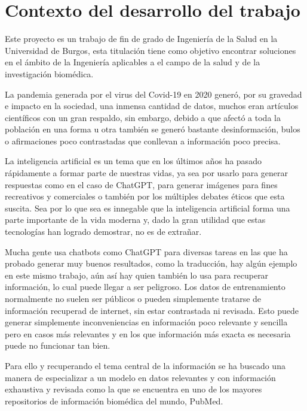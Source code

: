 
\section{Contexto del desarrollo del trabajo}

Este proyecto es un trabajo de fin de grado de Ingeniería de la Salud en la Universidad de Burgos, esta titulación tiene como objetivo encontrar soluciones en el ámbito de la Ingeniería aplicables a el campo de la salud y de la investigación biomédica.

La pandemia generada por el virus del Covid-19 en 2020 generó, por su gravedad e impacto en la sociedad, una inmensa cantidad de datos, muchos eran artículos científicos con un gran respaldo, sin embargo, debido a que afectó a toda la población en una forma u otra también se generó bastante desinformación, bulos o afirmaciones poco contrastadas que conllevan a información poco precisa.

La inteligencia artificial es un tema que en los últimos años ha pasado rápidamente a formar parte de nuestras vidas, ya sea por usarlo para generar respuestas como en el caso de ChatGPT, para generar imágenes para fines recreativos y comerciales o también por los múltiples debates éticos que esta suscita. Sea por lo que sea es innegable que la inteligencia artificial forma una parte importante de la vida moderna y, dado la gran utilidad que estas tecnologías han logrado demostrar, no es de extrañar.

Mucha gente usa chatbots como ChatGPT para diversas tareas en las que ha probado generar muy buenos resultados, como la traducción, hay algún ejemplo en este mismo trabajo, aún así hay quien también lo usa para recuperar información, lo cual puede llegar a ser peligroso. Los datos de entrenamiento normalmente no suelen ser públicos o pueden simplemente tratarse de información recuperad de internet, sin estar contrastada ni revisada. Esto puede generar simplemente inconveniencias en información poco relevante y sencilla pero en casos más relevantes y en los que información más exacta es necesaria puede no funcionar tan bien.

Para ello y recuperando el tema central de la información se ha buscado una manera de especializar a un modelo en datos relevantes y con información exhaustiva y revisada como la que se encuentra en uno de los mayores repositorios de información biomédica del mundo, PubMed.


